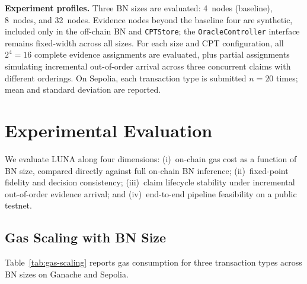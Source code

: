 \documentclass[journal]{IEEEtran}
\begin{document}
\textbf{Experiment profiles.}
Three BN sizes are evaluated: 4~nodes (baseline),
8~nodes, and 32~nodes. Evidence nodes beyond the
baseline four are synthetic, included only in the
off-chain BN and \texttt{CPTStore}; the
\texttt{OracleController} interface remains
fixed-width across all sizes. For each size and CPT
configuration, all $2^4=16$ complete evidence
assignments are evaluated, plus partial assignments
simulating incremental out-of-order arrival across
three concurrent claims with different orderings.
On Sepolia, each transaction type is submitted
$n=20$ times; mean and standard deviation are
reported.


\section{Experimental Evaluation}
\label{sec:experimental-analysis}

We evaluate LUNA along four dimensions:
(i)~on-chain gas cost as a function of BN size,
compared directly against full on-chain BN inference;
(ii)~fixed-point fidelity and decision consistency;
(iii)~claim lifecycle stability under incremental
out-of-order evidence arrival; and
(iv)~end-to-end pipeline feasibility on a public
testnet.

\subsection{Gas Scaling with BN Size}
\label{sec:exp-bn-size}

Table~\ref{tab:gas-scaling} reports gas consumption
for three transaction types across BN sizes on Ganache
and Sepolia.
\end{document}
